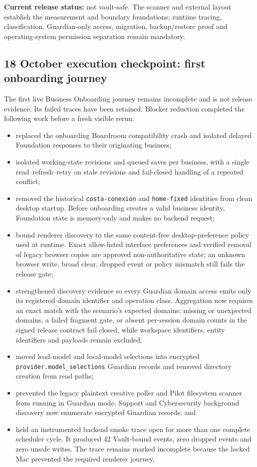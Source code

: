 \documentclass[11pt]{article}
\newcommand{\code}[1]{\texttt{#1}}
\begin{document}
\noindent\textbf{Current release status:} \textcolor{TessarisRed}{not vault-safe}. The scanner and external layout establish the measurement and boundary foundations; runtime tracing, classification, Guardian-only access, migration, backup/restore proof and operating-system permission separation remain mandatory.

\subsection{18 October execution checkpoint: first onboarding journey}

The first live Business Onboarding journey remains incomplete and is not release evidence. Its failed traces have been retained. Blocker reduction completed the following work before a fresh visible rerun:

\begin{itemize}
  \item replaced the onboarding Boardroom compatibility crash and isolated delayed Foundation responses to their originating business;
  \item isolated working-state revisions and queued saves per business, with a single read--refresh--retry on stale revisions and fail-closed handling of a repeated conflict;
  \item removed the historical \code{costa-conexion} and \code{home-fixed} identities from clean desktop startup. Before onboarding creates a valid business identity, Foundation state is memory-only and makes no backend request;
  \item bound renderer discovery to the same content-free desktop-preference policy used at runtime. Exact allow-listed interface preferences and verified removal of legacy browser copies are approved non-authoritative state; an unknown browser write, broad clear, dropped event or policy mismatch still fails the release gate;
  \item strengthened discovery evidence so every Guardian domain access emits only its registered domain identifier and operation class. Aggregation now requires an exact match with the scenario's expected domains; missing or unexpected domains, a failed fragment gate, or absent per-session domain counts in the signed release contract fail closed, while workspace identifiers, entity identifiers and payloads remain excluded;
  \item moved lead-model and local-model selections into encrypted \code{provider.model\_selections} Guardian records and removed directory creation from read paths;
  \item prevented the legacy plaintext creative poller and Pilot filesystem scanner from running in Guardian mode. Support and Cybersecurity background discovery now enumerate encrypted Guardian records; and
  \item held an instrumented backend smoke trace open for more than one complete scheduler cycle. It produced 42 Vault-bound events, zero dropped events and zero unsafe writes. The trace remains marked incomplete because the locked Mac prevented the required renderer journey.
\end{itemize}
\end{document}
